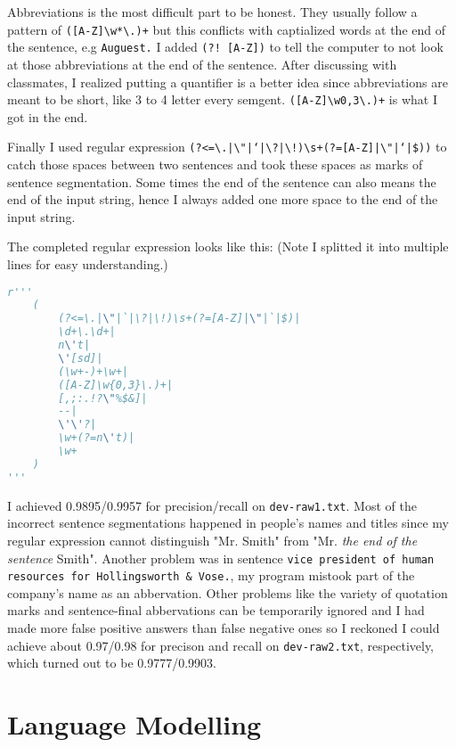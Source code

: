 \documentclass[11pt]{article} %
\begin{document}
Abbreviations is the most difficult part to be honest. They usually follow a pattern of \texttt{([A-Z]\textbackslash w*\textbackslash.)+} but this conflicts with captialized words at the end of the sentence, e.g \verb|Auguest.| I added \texttt{(?! [A-Z])} to tell the computer to not look at those abbreviations at the end of the sentence. After discussing with classmates, I realized putting a quantifier is a better idea since abbreviations are meant to be short, like 3 to 4 letter every semgent. \texttt{([A-Z]\textbackslash w{0,3}\textbackslash.)+} is what I got in the end.

Finally I used regular expression \texttt{(?<=\textbackslash.|\textbackslash"|`|\textbackslash?|\textbackslash!)\textbackslash s+(?=[A-Z]|\textbackslash"|`|\$))} to catch those spaces between two sentences and took these spaces as marks of sentence segmentation. Some times the end of the sentence can also means the end of the input string, hence I always added one more space to the end of the input string.

The completed regular expression looks like this: (Note I splitted it into multiple lines for easy understanding.)

\begin{lstlisting}[language=Python, frame=single, showstringspaces=false]
r'''
    (
        (?<=\.|\"|`|\?|\!)\s+(?=[A-Z]|\"|`|$)|
        \d+\.\d+|
        n\'t|
        \'[sd]|
        (\w+-)+\w+|
        ([A-Z]\w{0,3}\.)+|
        [,;:.!?\"%$&]|
        --|
        \'\'?|
        \w+(?=n\'t)|
        \w+
    )
'''
\end{lstlisting}

I achieved 0.9895/0.9957 for precision/recall on \texttt{dev-raw1.txt}. Most of the incorrect sentence segmentations happened in people's names and titles since my regular expression cannot distinguish "Mr. Smith" from "Mr. {\it the end of the sentence} Smith". Another problem was in sentence \texttt{vice president of human resources for Hollingsworth \& Vose.}, my program mistook part of the company's name as an abbervation. Other problems like the variety of quotation marks and sentence-final abbervations can be temporarily ignored and I had made more false positive answers than false negative ones so I reckoned I could achieve about 0.97/0.98 for precison and recall on \texttt{dev-raw2.txt}, respectively, which turned out to be 0.9777/0.9903.

\section{Language Modelling}
\end{document}
